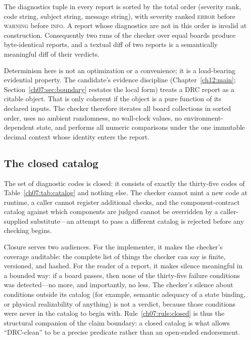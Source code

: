 \begin{invariant}\label{ch07:inv:order}
The diagnostics tuple in every report is sorted by the total order (severity rank, code string, subject string, message string), with severity ranked \textsc{error} before \textsc{warning} before \textsc{info}. A report whose diagnostics are not in this order is invalid at construction. Consequently two runs of the checker over equal boards produce byte-identical reports, and a textual diff of two reports is a semantically meaningful diff of their verdicts.
\end{invariant}

Determinism here is not an optimization or a convenience; it is a load-bearing evidential property. The candidate's evidence discipline (Chapter~\ref{ch12:main}; Section~\ref{ch07:sec:boundary} restates the local form) treats a DRC report as a citable object. That is only coherent if the object is a pure function of its declared inputs. The checker therefore iterates all board collections in sorted order, uses no ambient randomness, no wall-clock values, no environment-dependent state, and performs all numeric comparisons under the one immutable decimal context whose identity enters the report.

\subsection{The closed catalog}

\begin{ruleenv}\label{ch07:rule:closed}
The set of diagnostic codes is closed: it consists of exactly the thirty-five codes of Table~\ref{ch07:tab:catalog} and nothing else. The checker cannot mint a new code at runtime, a caller cannot register additional checks, and the component-contract catalog against which components are judged cannot be overridden by a caller-supplied substitute---an attempt to pass a different catalog is rejected before any checking begins.
\end{ruleenv}

Closure serves two audiences. For the implementer, it makes the checker's coverage auditable: the complete list of things the checker can say is finite, versioned, and hashed. For the reader of a report, it makes silence meaningful in a bounded way: if a board passes, then none of the thirty-five failure conditions was detected---no more, and importantly, no less. The checker's silence about conditions outside its catalog (for example, semantic adequacy of a state binding, or physical realizability of anything) is not a verdict, because those conditions were never in the catalog to begin with. Rule~\ref{ch07:rule:closed} is thus the structural companion of the claim boundary: a closed catalog is what allows ``DRC-clean'' to be a precise predicate rather than an open-ended endorsement.

